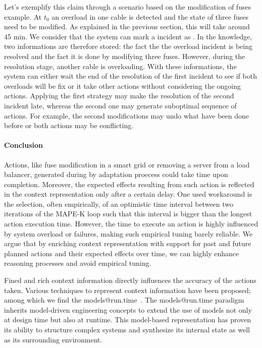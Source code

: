 Let's exemplify this claim through a scenario based on the modification of fuses example.
At $t_{0}$ an overload in one cable is detected and the state of three fuses need to be modified.
As explained in the previous section, this will take around 45 min.
We consider that the system can mark a incident as .
In the knowledge, two informations are therefore stored: the fact the the overload incident is being resolved and the fact it is done by modifying three fuses.
However, during the resolution stage, another cable is overloading.
With these informations, the system can either wait the end of the resolution of the first incident to see if both overloads will be fix or it take other actions without considering the ongoing actions.
Applying the first strategy may make the resolution of the second incident late, whereas the second one may generate suboptimal sequence of actions.
For example, the second modifications may undo what have been done before or both actions may be conflicting.

\paragraph{Conclusion}
Actions, like fuse modification in a smart grid or removing a server from a load balancer, generated during by adaptation proecess could take time upon completion. 
Moreover, the expected effects resulting from such action is reflected in the context representation only after a certain delay. 
One used workaround is the selection, often empirically, of an optimistic time interval between two iterations of the MAPE-K loop such that this interval is bigger than the longest action execution time.
However, the time to execute an action is highly influenced by system overload or failures, making such empirical tuning barely reliable.
We argue that by enriching context representation with support for past and future planned actions and their expected effects over time, we can highly enhance reasoning processes and avoid empirical tuning.

Fined and rich context information directly influences the accuracy of the actions taken.
Various techniques to represent context information have been proposed; among which we find the models@run.time~\cite{DBLP:journals/computer/MorinBJFS09, DBLP:journals/computer/BlairBF09}.
The models@run.time paradigm inherits model-driven engineering concepts to extend the use of models not only at design time but also at runtime. 
This model-based representation has proven its ability to structure complex systems and synthesize its internal state as well as its surrounding environment.

